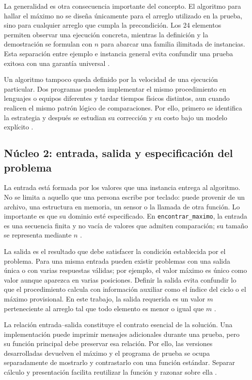 \documentclass[12pt,letterpaper]{article}
\newcommand{\codigo}[1]{\texttt{#1}}
\begin{document}
La generalidad es otra consecuencia importante del concepto. El algoritmo para hallar el máximo no se diseña únicamente para el arreglo utilizado en la prueba, sino para cualquier arreglo que cumpla la precondición. Los 24 elementos permiten observar una ejecución concreta, mientras la definición y la demostración se formulan con $n$ para abarcar una familia ilimitada de instancias. Esta separación entre ejemplo e instancia general evita confundir una prueba exitosa con una garantía universal \citep{aho1974,cormen2022,knuth1997}.

Un algoritmo tampoco queda definido por la velocidad de una ejecución particular. Dos programas pueden implementar el mismo procedimiento en lenguajes o equipos diferentes y tardar tiempos físicos distintos, aun cuando realicen el mismo patrón lógico de comparaciones. Por ello, primero se identifica la estrategia y después se estudian su corrección y su costo bajo un modelo explícito \citep{aho1974,sedgewick2011,skiena2020}.

\subsection{Núcleo 2: entrada, salida y especificación del problema}

La entrada está formada por los valores que una instancia entrega al algoritmo. No se limita a aquello que una persona escribe por teclado: puede provenir de un archivo, una estructura en memoria, un sensor o la llamada de otra función. Lo importante es que su dominio esté especificado. En \codigo{encontrar\_maximo}, la entrada es una secuencia finita y no vacía de valores que admiten comparación; su tamaño se representa mediante $n$ \citep{zanabria2026,cormen2022,goodrichpy2013}.

La salida es el resultado que debe satisfacer la condición establecida por el problema. Para una misma entrada pueden existir problemas con una salida única o con varias respuestas válidas; por ejemplo, el valor máximo es único como valor aunque aparezca en varias posiciones. Definir la salida evita confundir lo que el procedimiento calcula con información auxiliar como el índice del ciclo o el máximo provisional. En este trabajo, la salida requerida es un valor $m$ perteneciente al arreglo tal que todo elemento es menor o igual que $m$ \citep{cormen2022,hoare1969,goodrichcpp2011}.

La relación entrada--salida constituye el contrato esencial de la solución. Una implementación puede imprimir mensajes adicionales durante una prueba, pero su función principal debe preservar esa relación. Por ello, las versiones desarrolladas devuelven el máximo y el programa de prueba se ocupa separadamente de mostrarlo y contrastarlo con una función estándar. Separar cálculo y presentación facilita reutilizar la función y razonar sobre ella \citep{liskov1974,sedgewick2011,goodrichpy2013}.
\end{document}
